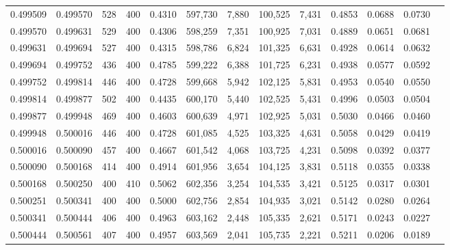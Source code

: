 \begin{tabular}{rrrrrrrrrrrrr}
0.499509 & 0.499570 &    528 & 400 &                                     0.4310 & 597,730 &   7,880 & 100,525 &   7,431 & 0.4853 & 0.0688 & 0.0730 \\
0.499570 & 0.499631 &    529 & 400 &                                     0.4306 & 598,259 &   7,351 & 100,925 &   7,031 & 0.4889 & 0.0651 & 0.0681 \\
0.499631 & 0.499694 &    527 & 400 &                                     0.4315 & 598,786 &   6,824 & 101,325 &   6,631 & 0.4928 & 0.0614 & 0.0632 \\
0.499694 & 0.499752 &    436 & 400 &                                     0.4785 & 599,222 &   6,388 & 101,725 &   6,231 & 0.4938 & 0.0577 & 0.0592 \\
0.499752 & 0.499814 &    446 & 400 &                                     0.4728 & 599,668 &   5,942 & 102,125 &   5,831 & 0.4953 & 0.0540 & 0.0550 \\
0.499814 & 0.499877 &    502 & 400 &                                     0.4435 & 600,170 &   5,440 & 102,525 &   5,431 & 0.4996 & 0.0503 & 0.0504 \\
0.499877 & 0.499948 &    469 & 400 &                                     0.4603 & 600,639 &   4,971 & 102,925 &   5,031 & 0.5030 & 0.0466 & 0.0460 \\
0.499948 & 0.500016 &    446 & 400 &                                     0.4728 & 601,085 &   4,525 & 103,325 &   4,631 & 0.5058 & 0.0429 & 0.0419 \\
0.500016 & 0.500090 &    457 & 400 &                                     0.4667 & 601,542 &   4,068 & 103,725 &   4,231 & 0.5098 & 0.0392 & 0.0377 \\
0.500090 & 0.500168 &    414 & 400 &                                     0.4914 & 601,956 &   3,654 & 104,125 &   3,831 & 0.5118 & 0.0355 & 0.0338 \\
0.500168 & 0.500250 &    400 & 410 &                                     0.5062 & 602,356 &   3,254 & 104,535 &   3,421 & 0.5125 & 0.0317 & 0.0301 \\
0.500251 & 0.500341 &    400 & 400 &                                     0.5000 & 602,756 &   2,854 & 104,935 &   3,021 & 0.5142 & 0.0280 & 0.0264 \\
0.500341 & 0.500444 &    406 & 400 &                                     0.4963 & 603,162 &   2,448 & 105,335 &   2,621 & 0.5171 & 0.0243 & 0.0227 \\
0.500444 & 0.500561 &    407 & 400 &                                     0.4957 & 603,569 &   2,041 & 105,735 &   2,221 & 0.5211 & 0.0206 & 0.0189 \\

\end{tabular}

